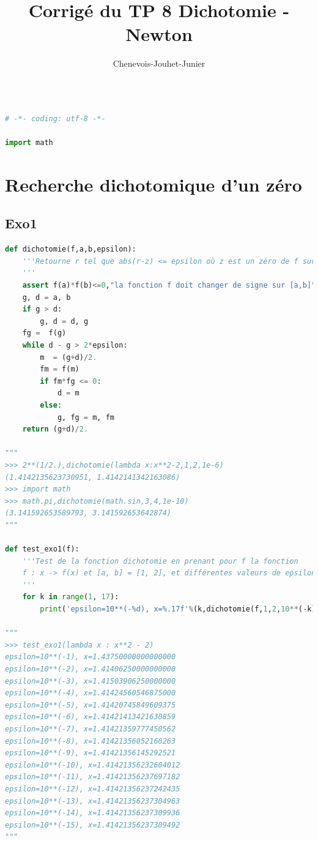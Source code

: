 \documentclass[
  11pt,
]{article}
\title{Corrigé du TP 8 Dichotomie - Newton}
\author{Chenevois-Jouhet-Junier}
\date{}
\newcounter{exo}
\newcounter{def}
\begin{document}
\maketitle

\renewcommand*\contentsname{Table des matières}
{
\hypersetup{linkcolor=}
\setcounter{tocdepth}{3}
\tableofcontents
}
\begin{lstlisting}[language=Python]
\end{lstlisting}

\begin{lstlisting}[language=Python]
# -*- coding: utf-8 -*-

import math
\end{lstlisting}

\hypertarget{recherche-dichotomique-dun-zuxe9ro}{%
\section{Recherche dichotomique d'un
zéro}\label{recherche-dichotomique-dun-zuxe9ro}}

\hypertarget{exo1}{%
\subsection{Exo1}\label{exo1}}

\begin{lstlisting}[language=Python]
def dichotomie(f,a,b,epsilon):
    '''Retourne r tel que abs(r-z) <= epsilon où z est un zéro de f sur [a;b]
    '''
    assert f(a)*f(b)<=0,"la fonction f doit changer de signe sur [a,b]"
    g, d = a, b
    if g > d:
        g, d = d, g
    fg =  f(g)
    while d - g > 2*epsilon:
        m  = (g+d)/2.
        fm = f(m)
        if fm*fg <= 0:
            d = m           
        else:
            g, fg = m, fm
    return (g+d)/2.
            
"""
>>> 2**(1/2.),dichotomie(lambda x:x**2-2,1,2,1e-6)
(1.4142135623730951, 1.4142141342163086)
>>> import math
>>> math.pi,dichotomie(math.sin,3,4,1e-10)
(3.141592653589793, 3.141592653642874)
"""

def test_exo1(f):
    '''Test de la fonction dichotomie en prenant pour f la fonction 
    f : x -> f(x) et [a, b] = [1, 2], et différentes valeurs de epsilon
    '''
    for k in range(1, 17):
        print('epsilon=10**(-%d), x=%.17f'%(k,dichotomie(f,1,2,10**(-k))))

"""
>>> test_exo1(lambda x : x**2 - 2)
epsilon=10**(-1), x=1.43750000000000000
epsilon=10**(-2), x=1.41406250000000000
epsilon=10**(-3), x=1.41503906250000000
epsilon=10**(-4), x=1.41424560546875000
epsilon=10**(-5), x=1.41420745849609375
epsilon=10**(-6), x=1.41421413421630859
epsilon=10**(-7), x=1.41421359777450562
epsilon=10**(-8), x=1.41421356052160263
epsilon=10**(-9), x=1.41421356145292521
epsilon=10**(-10), x=1.41421356232604012
epsilon=10**(-11), x=1.41421356237697182
epsilon=10**(-12), x=1.41421356237242435
epsilon=10**(-13), x=1.41421356237304963
epsilon=10**(-14), x=1.41421356237309936
epsilon=10**(-15), x=1.41421356237309492
"""
\end{lstlisting}
\end{document}
